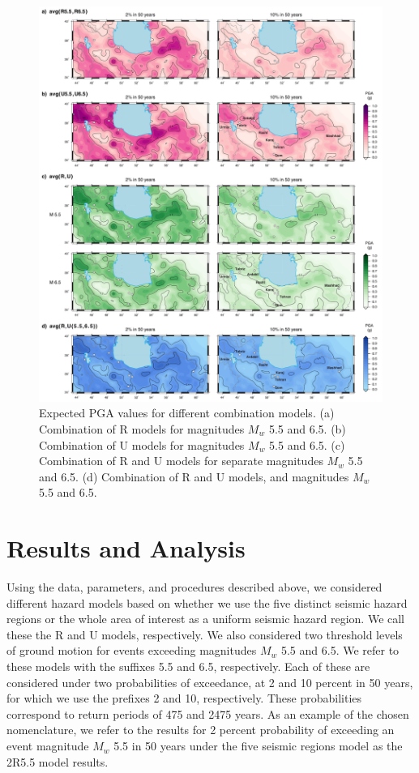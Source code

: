 \begin{figure}[th!]
    \centering
    \includegraphics[width=\textwidth]{figures/pdf/figure-11.pdf} 
    \caption{Expected PGA values for different combination models. (a) Combination of R models for magnitudes $M_w$ 5.5 and 6.5. (b) Combination of U models for magnitudes $M_w$ 5.5 and 6.5. (c) Combination of R and U models for separate magnitudes $M_w$ 5.5 and 6.5. (d) Combination of R and U models, and magnitudes $M_w$ 5.5 and 6.5.}
    \label{fig:pgaavgs}
\end{figure}

\section{Results and Analysis}

Using the data, parameters, and procedures described above, we considered different hazard models based on whether we use the five distinct seismic hazard regions or the whole area of interest as a uniform seismic hazard region. We call these the R and U models, respectively. We also considered two threshold levels of ground motion for events exceeding magnitudes $M_w$ 5.5 and 6.5. We refer to these models with the suffixes 5.5 and 6.5, respectively. Each of these are considered under two probabilities of exceedance, at 2 and 10 percent in 50 years, for which we use the prefixes 2 and 10, respectively. These probabilities correspond to return periods of 475 and 2475 years. As an example of the chosen nomenclature, we refer to the results for 2 percent probability of exceeding an event magnitude $M_w$ 5.5 in 50 years under the five seismic regions model as the 2R5.5 model results.

